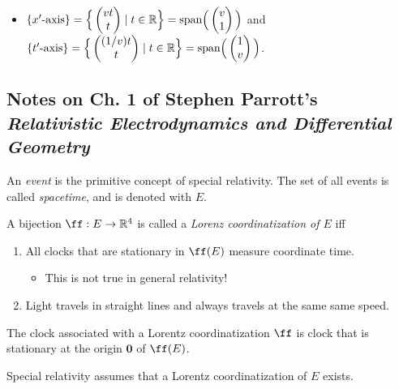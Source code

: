 \documentclass{article}
\begin{document}
\begin{itemize}
    \item $\{\text{$x'$-axis}\} = \Big\{ \begin{pmatrix} vt \\ t \end{pmatrix} \mid t \in \mathbb{R} \Big\} = \text{span}\Big(\begin{pmatrix} v \\ 1 \end{pmatrix}\Big)$ and $\{\text{$t'$-axis}\} = \Big\{ \begin{pmatrix} (1/v)t \\ t \end{pmatrix} \mid t \in \mathbb{R} \Big\} = \text{span}\Big( \begin{pmatrix} 1 \\ v \end{pmatrix} \Big)$.
\end{itemize}

\newpage

\subsection*{Notes on Ch. 1 of Stephen Parrott's \textit{Relativistic Electrodynamics and Differential Geometry}}

An \textit{event} is the primitive concept of special relativity. The set of all events is called \textit{spacetime}, and is denoted with $E$.

\vspace{.5cm}

A bijection $\ff:E \rightarrow \R^4$ is called a \textit{Lorenz coordinatization of $E$} iff 
\begin{enumerate}
    \item All clocks that are stationary in $\ff(E)$ measure coordinate time.
    \begin{itemize}
        \item This is not true in general relativity!
    \end{itemize}
    \item Light travels in straight lines and always travels at the same same speed.
\end{enumerate}

The clock associated with a Lorentz coordinatization $\ff$ is clock that is stationary at the origin $\mathbf{0}$ of $\ff(E)$.

Special relativity assumes that a Lorentz coordinatization of $E$ exists.
\end{document}
